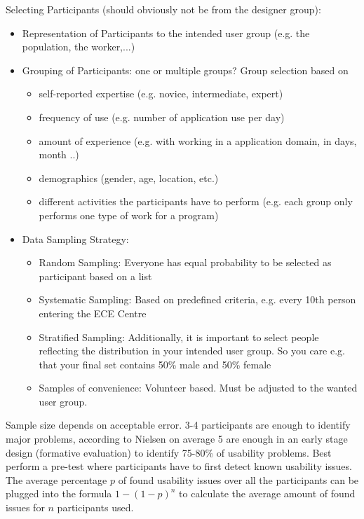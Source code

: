 Selecting Participants (should obviously not be from the designer group):
\begin{itemize}
\item Representation of Participants to the intended user group (e.g. the population, the worker,...)
\item Grouping of Participants: one or multiple groups? Group selection based on
\begin{itemize}
\item self-reported expertise (e.g. novice, intermediate, expert)
\item frequency of use (e.g. number of application use per day)
\item amount of experience (e.g. with working in a application domain, in days, month ..)
\item demographics (gender, age, location, etc.)
\item different activities the participants have to perform (e.g. each group only performs one type of work for a
program)
\end{itemize}
\item Data Sampling Strategy:
\begin{itemize}
\item Random Sampling: Everyone has equal probability to be selected as participant based on a list
\item Systematic Sampling: Based on predefined criteria, e.g. every 10th person entering the ECE Centre
\item Stratified Sampling: Additionally, it is important to select people reflecting the distribution in your intended user group. So you care e.g. that your final set contains 50\% male and 50\% female
\item Samples of convenience: Volunteer based. Must be adjusted to the wanted user group.
\end{itemize}
\end{itemize}

Sample size depends on acceptable error. 3-4 participants are enough to identify major problems, according to Nielsen on average 5 are enough in an early stage design (formative evaluation) to identify 75-80\% of usability problems.
Best perform a pre-test where participants have to first detect known usability issues. The average percentage $p$ of found usability issues over all the participants can be plugged into the formula $1-(1-p)^n$ to calculate the average amount of found issues for $n$ participants used.\\

